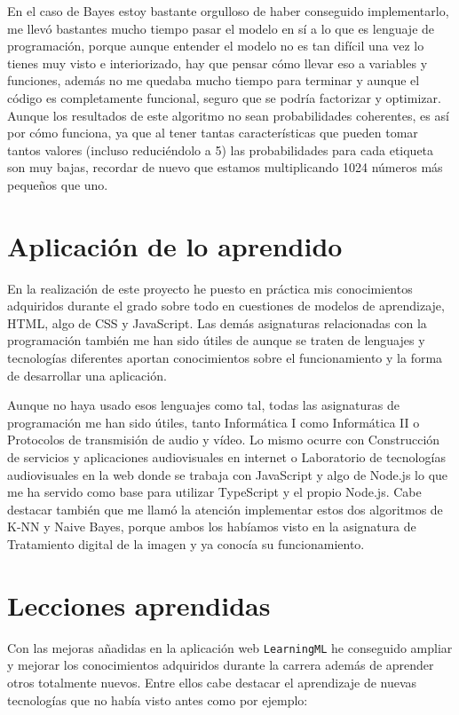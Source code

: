 \documentclass[a4paper, 12pt]{book}
\begin{document}
En el caso de Bayes estoy bastante orgulloso de haber conseguido implementarlo, me llevó bastantes mucho tiempo pasar el modelo en sí a lo que es lenguaje de programación, porque aunque entender el modelo no es tan difícil una vez lo tienes muy visto e interiorizado, hay que pensar cómo llevar eso a variables y funciones, además no me quedaba mucho tiempo para terminar y aunque el código es completamente funcional, seguro que se podría factorizar y optimizar. Aunque los resultados de este algoritmo no sean probabilidades coherentes, es así por cómo funciona, ya que al tener tantas características que pueden tomar tantos valores (incluso reduciéndolo a 5) las probabilidades para cada etiqueta son muy bajas, recordar de nuevo que estamos multiplicando 1024 números más pequeños que uno.


\section{Aplicación de lo aprendido}
\label{sec:aplicacion}

En la realización de este proyecto he puesto en práctica mis conocimientos adquiridos durante el grado sobre todo en cuestiones de modelos de aprendizaje, HTML, algo de CSS y JavaScript. Las demás asignaturas relacionadas con la programación también me han sido útiles de aunque se traten de lenguajes y tecnologías diferentes aportan conocimientos sobre el funcionamiento y la forma de desarrollar una aplicación.
 
Aunque no haya usado esos lenguajes como tal, todas las asignaturas de programación me han sido útiles, tanto Informática I como Informática II o Protocolos de transmisión de audio y vídeo. Lo mismo ocurre con Construcción de servicios y aplicaciones audiovisuales en internet o Laboratorio de tecnologías audiovisuales en la web donde se trabaja con JavaScript y algo de Node.js lo que me ha servido como base para utilizar TypeScript y el propio Node.js. Cabe destacar también que me llamó la atención implementar estos dos algoritmos de K-NN y Naive Bayes, porque ambos los habíamos visto en la asignatura de Tratamiento digital de la imagen y ya conocía su funcionamiento.

\section{Lecciones aprendidas}
\label{sec:lecciones_aprendidas}

Con las mejoras añadidas en la aplicación web \texttt{LearningML} he conseguido ampliar y mejorar los conocimientos adquiridos durante la carrera además de aprender otros totalmente nuevos. Entre ellos cabe destacar el aprendizaje de nuevas tecnologías que no había visto antes como por ejemplo:
\end{document}
